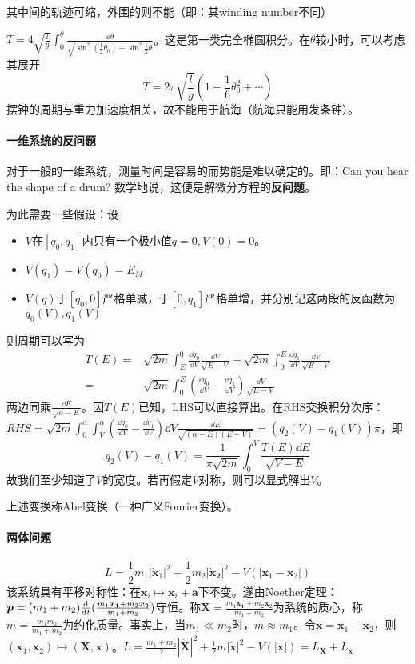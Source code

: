 \documentclass{ctexbook}
\begin{document}
其中间的轨迹可缩，外围的则不能（即：其winding number不同）

$T=4\sqrt{\frac l g}\int_{0}^{\theta}\frac{\dd\theta}{\sqrt{\sin^{2}(\frac{1}{2}\theta_{0})-\sin^{2}\frac{1}{2}\theta}}$。这是第一类完全椭圆积分。在$\theta$较小时，可以考虑其展开
\[T=2\pi\sqrt{\frac l g}(1+\frac{1}{6}\theta_{0}^{2}+\cdots)\]
摆钟的周期与重力加速度相关，故不能用于航海（航海只能用发条钟）。

\paragraph{一维系统的反问题}
对于一般的一维系统，测量时间是容易的而势能是难以确定的。即：Can you hear the shape of a drum? 数学地说，这便是解微分方程的\textbf{反问题}。

为此需要一些假设：设
\begin{itemize}
\item   $V$在$[q_{0},q_{1}]$内只有一个极小值$q=0,V(0)=0$。
\item   $V(q_{1})=V(q_{0})=E_{M}$
\item   $V(q)$于$[q_{0},0]$严格单减，于$[0,q_{1}]$严格单增，并分别记这两段的反函数为$q_{0}(V),q_{1}(V)$
\end{itemize}
则周期可以写为
\begin{align*}
  T(E)=&\sqrt{2m}\int_{E}^{0}\frac{\dd q_{0}}{\dd V}\frac{\dd V}{\sqrt{E-V}}+\sqrt{2m}\int_{0}^{E}\frac{\dd q_{1}}{\dd V}\frac{\dd V}{\sqrt{E-V}}\\
  =&\sqrt{2m}\int_{0}^{E}(\frac{\dd q_{0}}{\dd V}-\frac{\dd q_{1}}{\dd V})\frac{\dd V}{\sqrt{E-V}}
\end{align*}
两边同乘$\frac{\dd E}{\sqrt{\alpha-E}}$。因$T(E)$已知，LHS可以直接算出。在RHS交换积分次序：$RHS=\sqrt{2m}\int_{0}^{\alpha}\int_{V}^{\alpha}(\frac{\dd q_{0}}{\dd V}-\frac{\dd q_{1}}{\dd V})\dd V\frac{\dd E}{\sqrt{(\alpha-E)(E-V)}}=(q_{2}(V)-q_{1}(V))\pi$，即
\[q_{2}(V)-q_{1}(V)=\frac{1}{\pi\sqrt{2m}}\int_{0}^{V}\frac{T(E)\dd E}{\sqrt{V-E}}\]
故我们至少知道了$V$的宽度。若再假定$V$对称，则可以显式解出$V$。

上述变换称Abel变换（一种广义Fourier变换）。

\paragraph{两体问题}
\[L=\frac{1}{2}m_{1}|\dot{\bm{x}}_{1}|^{2}+\frac{1}{2}m_{2}|\bm{\dot{x}_{2}}|^{2}-V(|\bm{x}_{1}-\bm{x}_{2}|)\]
该系统具有平移对称性：在$\bm{x}_{i}\mapsto \bm{x}_{i}+\bm{a}$下不变。遂由Noether定理：
$\bm{p}=(m_{1}+m_{2})\frac{\mathrm{d}}{\mathrm{d}t}(\frac{m_{1}\bm{x_{1}}+m_{2}\bm{x}_{2}}{m_{1}+m_{2}})$守恒。称$\bm{X}=\frac{m_{1}\bm{x_{1}}+m_{2}\bm{x}_{2}}{m_{1}+m_{2}}$为系统的质心，称$m=\frac{m_{1}m_{2}}{m_{1}+m_{2}}$为约化质量。事实上，当$m_{1}\ll m_{2}$时，$m\approx m_{1}$。令$\bm{x}=\bm{x}_{1}-\bm{x}_{2}$，则$(\bm x_{1},\bm x_{2})\mapsto (\bm X,\bm x)$。$L=\frac{m_{1}+m_{2}}{2}|\dot{\bm{X}}|^{2}+\frac{1}{2}m|\dot{\bm{x}}|^{2}-V(|\bm{x}|)=L_{\bm X}+L_{\bm x}$
\end{document}
